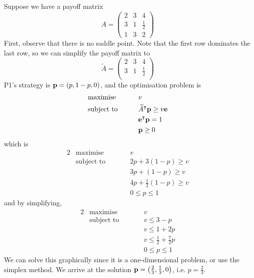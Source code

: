 \begin{example}
    Suppose we have a payoff matrix
    \[ A = \begin{pmatrix}
        2 & 3 & 4 \\
        3 & 1 & \frac{1}{2} \\
        1 & 3 & 2
    \end{pmatrix} \]
    First, observe that there is no saddle point.
    Note that the first row dominates the last row, so we can simplify the payoff matrix to
    \[ \widetilde{A} = \begin{pmatrix}
        2 & 3 & 4 \\
        3 & 1 & \frac{1}{2} \\
    \end{pmatrix} \]
    P1's strategy is \( \vb p = (p, 1-p, 0) \), and the optimisation problem is
    \begin{alignat*}{2}
        & \text{maximise} & \qquad & v            \\
        & \text{subject to}                                &        & \widetilde{A}^\intercal \vb p \geq v \vb e \\
        & & & \vb e^\intercal \vb p = 1 \\
        & & & \vb p \geq 0
    \end{alignat*}
    which is
    \begin{alignat*}{2}
        & \text{maximise} & \qquad & v            \\
        & \text{subject to}                                &        & 2p + 3(1-p) \geq v \\
        & & & 3p + (1-p) \geq v \\
        & & & 4p + \frac{1}{2}(1-p) \geq v \\
        & & & 0 \leq p \leq 1
    \end{alignat*}
    and by simplifying,
    \begin{alignat*}{2}
        & \text{maximise} & \qquad & v            \\
        & \text{subject to}                                &        & v \leq 3 - p \\
        & & & v \leq 1 + 2p \\
        & & & v \leq \frac{1}{2} + \frac{7}{2}p \\
        & & & 0 \leq p \leq 1
    \end{alignat*}
    We can solve this graphically since it is a one-dimensional problem, or use the simplex method.
    We arrive at the solution \( \vb p = \qty(\frac{2}{3}, \frac{1}{3}, 0) \), i.e. \( p = \frac{2}{3} \).

\end{example}
